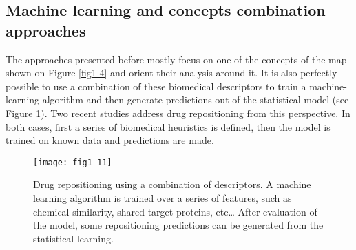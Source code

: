 \subsection{Machine learning and concepts combination approaches}

The approaches presented before mostly focus on one of the concepts of the map shown on Figure \ref{fig1-4} and orient their analysis around it. It is also perfectly possible to use a combination of these biomedical descriptors to train a machine-learning algorithm and then generate predictions out of the statistical model (see Figure \ref{fig1-11}). Two recent studies address drug repositioning from this perspective. In both cases, first a series of biomedical heuristics is defined, then the model is trained on known data and predictions are made.

\begin{figure}[ht]
    \centering
    \texttt{[image: fig1-11]}
    \caption{Drug repositioning using a combination of descriptors. A machine learning algorithm is trained over a series of features, such as chemical similarity, shared target proteins, etc… After evaluation of the model, some repositioning predictions can be generated from the statistical learning.}
    \label{fig1-11}
\end{figure}

